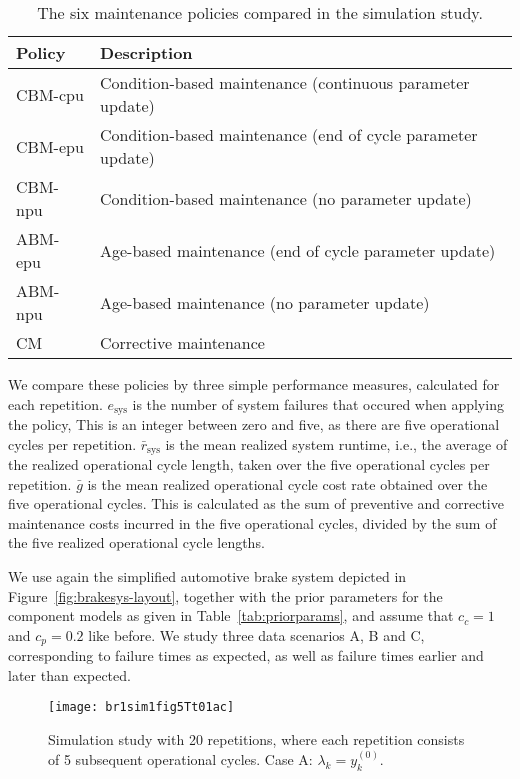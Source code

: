 \documentclass[authoryear]{elsarticle}
\newcommand{\uz}{^{(0)}} %
\def\ykz{y\uz_k}
\newcommand{\esys}{e_\text{sys}}
\newcommand{\mrsys}{\bar{r}_\text{sys}}
\begin{document}
\begin{table}
\centering
\begin{tabular}{ll}
  \toprule
Policy & Description \\
  \midrule
CBM-cpu & Condition-based maintenance (continuous parameter update)\\
CBM-epu & Condition-based maintenance (end of cycle parameter update)\\
CBM-npu & Condition-based maintenance (no parameter update)\\
ABM-epu & Age-based maintenance (end of cycle parameter update)\\
ABM-npu & Age-based maintenance (no parameter update)\\
CM      & Corrective maintenance\\
  \bottomrule
\end{tabular}
\caption{The six maintenance policies compared in the simulation study.}
\label{tab:sim-abbrev}
\end{table}

We compare these policies by three simple performance measures,
calculated for each repetition. %
$\esys$ is the number of system failures that occured when applying the policy,
This is an integer between zero and five, as there are five operational cycles per repetition.
$\mrsys$ is the mean realized system runtime,
i.e., the average of the realized operational cycle length,
taken over the five operational cycles per repetition.
$\bar{g}$ is the mean realized operational cycle cost rate obtained over the five operational cycles.
This is calculated as the sum of preventive and corrective maintenance costs incurred in the five operational cycles,
divided by the sum of the five realized operational cycle lengths.

We use again the simplified automotive brake system depicted in Figure~\ref{fig:brakesys-layout},
together with the prior parameters for the component models as given in Table~\ref{tab:priorparams},
and assume that $c_c = 1$ and $c_p = 0.2$ like before.
We study three data scenarios A, B and C, corresponding to failure times as expected, as well as
failure times earlier and later than expected.

\begin{figure}
\texttt{[image: br1sim1fig5Tt01ac]}
\caption{Simulation study with 20 repetitions, where each repetition consists of 5 subsequent operational cycles.
Case A: $\lambda_k = \ykz$.}
\label{fig:br1sim1fig5Tt01}
\end{figure}
\end{document}
